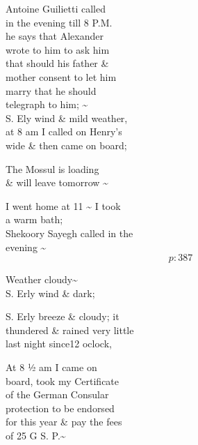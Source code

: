 \documentclass{report}
\begin{document}
	\par{
 	Antoine Guilietti called\ \\in the evening till 8 P.M.\ \\he says that Alexander\ \\wrote to him to ask him\ \\that should his father \&\ \\mother consent to let him\ \\marry that he should\ \\telegraph to him; \~{}\ \\S. Ely wind \& mild weather,\ \\at 8 am I called on Henry's\ \\wide \& then came on board;\ \\
	}

	\par{
 	The Mossul is loading\ \\\& will leave tomorrow \~{}\ \\
	}

	\par{
 	I went home at 11 \~{} I took\ \\a warm bath;\ \\Shekoory Sayegh called in the\ \\evening \~{}\ \\
  \[p: 387 \]

	}




	\par{
 	Weather cloudy\~{}\ \\S. Erly wind \& dark;\ \\
	}

	\par{
 	S. Erly breeze \& cloudy; it\ \\thundered \& rained very little\ \\last night since12 oclock,\ \\
	}

	\par{
 	At 8 ½ am I came on\ \\board, took my Certificate\ \\of the German Consular\ \\protection to be endorsed\ \\for this year \& pay the fees\ \\of 25 G S. P.\~{}\ \\
	}
\end{document}
